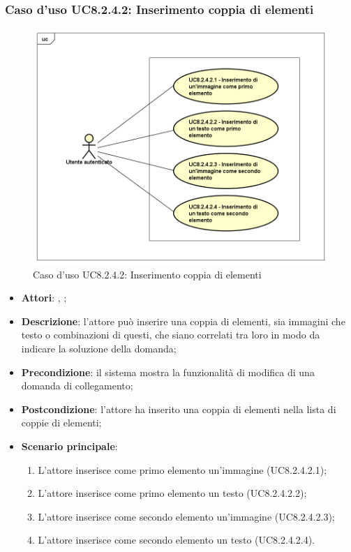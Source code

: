 	\subsubsection{Caso d'uso UC8.2.4.2: Inserimento coppia di elementi}
	\label{UC8.2.4.2}
	\begin{figure}[h]
		\centering
		\includegraphics[scale=0.5,keepaspectratio]{UML/UC8_2_4_2.png}
		\caption{Caso d'uso UC8.2.4.2: Inserimento coppia di elementi}
	\end{figure}
	\FloatBarrier
	\begin{itemize}
		\item \textbf{Attori}: \uau, \uaupro;
		\item \textbf{Descrizione}: l'attore può inserire una coppia di elementi, sia immagini che testo o combinazioni di questi, che siano correlati tra loro in modo da indicare la soluzione della domanda; 
		\item \textbf{Precondizione}: il sistema mostra la funzionalità di modifica di una domanda di collegamento; 
		\item \textbf{Postcondizione}: l'attore ha inserito una coppia di elementi nella lista di coppie di elementi; 
		\item \textbf{Scenario principale}: 
		\begin{enumerate}
			\item L'attore inserisce come primo elemento un'immagine (UC8.2.4.2.1);
			\item L'attore inserisce come primo elemento un testo (UC8.2.4.2.2);
			\item L'attore inserisce come secondo elemento un'immagine (UC8.2.4.2.3);
			\item L'attore inserisce come secondo elemento un testo (UC8.2.4.2.4).	
		\end{enumerate}
	\end{itemize}
	
